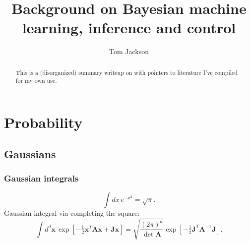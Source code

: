 \documentclass[notitlepage,openany,11pt]{report}
\makeatletter
\theoremstyle{plain}%
\numberwithin{equation}{section}
\newcommand*{\toccontents}{\@starttoc{toc}}
\makeatother
\begin{document}
\newcommand {\be}{\begin{equation*}}
\newcommand {\ee} {\end{equation*}}
\newcommand{\boldref}[1]{\textbf{\ref{#1}}}
\newcommand{\boldnameref}[1]{\textbf{\nameref{#1}}}

\newcommand{\mbf}[1]{\mathbf{#1}}
\newcommand{\mbb}[1]{\mathbb{#1}}
\newcommand{\mcal}[1]{\mathcal{#1}}
\newcommand{\mtilde}[1]{\widetilde{#1}}
\newcommand{\mhat}[1]{\widehat{#1}}
\newcommand{\mol}[1]{\overline{#1}}


\title{Background on Bayesian machine learning, inference and control}
\author{Tom Jackson}

\hypersetup{pageanchor=false} %

\maketitle

\begin{abstract}
This is a (disorganized) summary writeup on with pointers to literature I've compiled for my own use.\end{abstract}

\hypersetup{pageanchor=true}

\toccontents

\restoregeometry


\chapter{Probability}

\section{Gaussians}

\subsection{Gaussian integrals}
\be
\int \! dx \, e^{-x^{2}} = \sqrt{\pi}.
\ee
Gaussian integral via completing the square:
\be
\int \! d^{d}\mbf{x} \, \exp \left[ - \tfrac{1}{2} \mbf{x}^{T} \mbf{A} \mbf{x} + \mbf{Jx} \right] = \sqrt{\frac{(2 \pi)^{d}}{\det \mbf{A}}} \exp \left[ - \tfrac{1}{2} \mbf{J}^{T} \mbf{A}^{-1} \mbf{J} \right].
\ee
\end{document}
